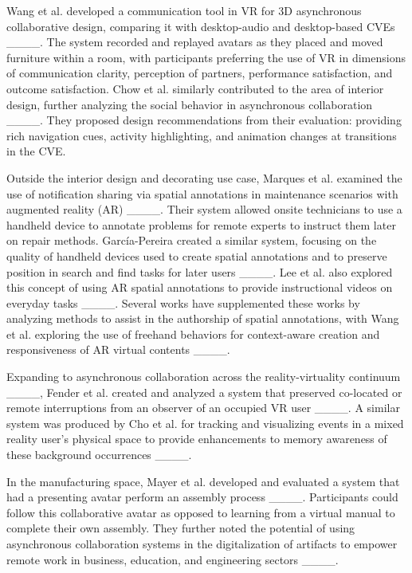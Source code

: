 Wang et al. developed a communication tool in VR for 3D asynchronous collaborative design, comparing it with desktop-audio and desktop-based CVEs ____.
The system recorded and replayed avatars as they placed and moved furniture within a room, with participants preferring the use of VR in dimensions of communication clarity, perception of partners, performance satisfaction, and outcome satisfaction.
Chow et al. similarly contributed to the area of interior design, further analyzing the social behavior in asynchronous collaboration ____.
They proposed design recommendations from their evaluation: providing rich navigation cues, activity highlighting, and animation changes at transitions in the CVE.

Outside the interior design and decorating use case, Marques et al. examined the use of notification sharing via spatial annotations in maintenance scenarios with augmented reality (AR) ____.
Their system allowed onsite technicians to use a handheld device to annotate problems for remote experts to instruct them later on repair methods.
García-Pereira created a similar system, focusing on the quality of handheld devices used to create spatial annotations and to preserve position in search and find tasks for later users ____.
Lee et al. also explored this concept of using AR spatial annotations to provide instructional videos on everyday tasks ____.
Several works have supplemented these works by analyzing methods to assist in the authorship of spatial annotations, with Wang et al. exploring the use of freehand behaviors for context-aware creation and responsiveness of AR virtual contents ____.

Expanding to asynchronous collaboration across the reality-virtuality continuum ____, Fender et al. created and analyzed a system that preserved co-located or remote interruptions from an observer of an occupied VR user ____.
A similar system was produced by Cho et al. for tracking and visualizing events in a mixed reality user's physical space to provide enhancements to memory awareness of these background occurrences ____.

In the manufacturing space, Mayer et al. developed and evaluated a system that had a presenting avatar perform an assembly process ____.
Participants could follow this collaborative avatar as opposed to learning from a virtual manual to complete their own assembly.
They further noted the potential of using asynchronous collaboration systems in the digitalization of artifacts to empower remote work in business, education, and engineering sectors ____.\\

